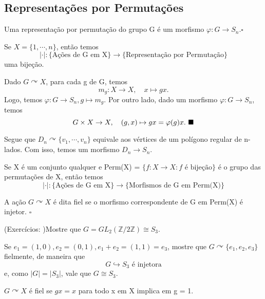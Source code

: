 \documentclass[algebra_notes.tex]{subfiles}
\begin{document}
\subsection{Representações por Permutações}
\begin{def*}
	Uma representação por permutação do grupo G é um morfismo \(\varphi :G\rightarrow S_{n}. \square\)
\end{def*}
\begin{prop*}
	Se \(X = \{1, \cdots, n\}\), então temos
	\[
		|\cdot |:\biggl\{\text{Ações de G em X}\biggr\}\rightarrow \biggl\{\text{Representação por Permutação}\biggr\}
	\]
	uma bijeção.
\end{prop*}
\begin{proof*}
	Dado \(G \curvearrowright X\), para cada g de G, temos
	\[
		m_{g}:X\rightarrow X,\quad x\mapsto gx.
	\]
	Logo, temos \(\varphi :G\rightarrow S_{n}, g\mapsto m_{g}.\) Por outro lado, dado um morfismo \(\varphi :G\rightarrow S_{n}\), temos
	\[
		G\times{}X\rightarrow X,\quad (g, x)\mapsto gx = \varphi (g)x.\text{ $\blacksquare$}
	\]
\end{proof*}
\begin{example*}
	Segue que \(D_{n}\curvearrowright \{v_{1}, \cdots, v_{n}\}\) equivale aos vértices de um polígono regular de n-lados. Com isso, temos um morfismo
	\(D_{n}\rightarrow S_{n}\).
\end{example*}
\begin{prop*}
	Se X é um conjunto qualquer e Perm(X) = \(\{f:X\rightarrow X: f \text{ é bijeção}\}\) é o grupo das permutações de X, então temos
	\[
		|\cdot |:\biggl\{\text{Ações de G em X}\biggr\}\rightarrow\biggl\{\text{Morfismos de G em Perm(X)}\biggr\}
	\]
\end{prop*}
\begin{def*}
	A ação \(G \curvearrowright X\) é dita fiel se o morfismo correspondente de G em Perm(X) é injetor. \(\square\)
\end{def*}
\begin{example*}
	(Exercícios: )Mostre que \(G = GL_{2}(\mathbb{Z}/2 \mathbb{Z})\cong{S_{3}}\).

	Se \(e_{1}=(1, 0), e_{2} = (0, 1), e_{1}+e_{2} = (1, 1) = e_{3}\), mostre que \(G \curvearrowright \{e_{1}, e_{2}, e_{3}\}\) fielmente, de maneira que
	\[
		G\hookrightarrow S_{3}\text{ é injetora}
	\]
	e, como \(|G| = |S_{3}|\), vale que \(G\cong{S_{3}.}\)

	\(G \curvearrowright X\) é fiel se \(gx=x\) para todo x em X implica em g = 1.
\end{example*}
\end{document}
